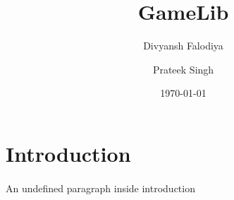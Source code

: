 \documentclass[a4paper,12pt]{report}
\begin{document}
	
\title{GameLib}
\author{Divyansh Falodiya}
\author{Prateek Singh}
\date{\today}
\maketitle

\section{Introduction}

\paragraph{}
An undefined paragraph inside introduction
\end{document}
